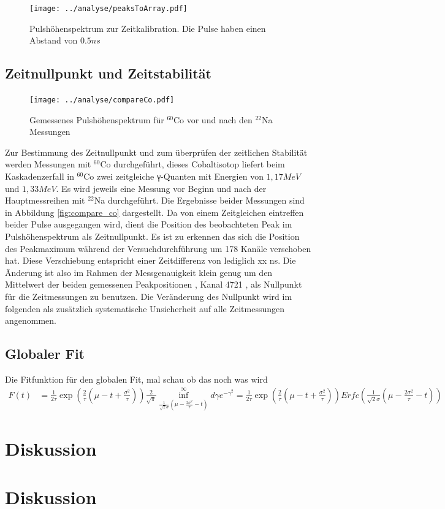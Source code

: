 \documentclass[a4paper,12pt]{article}
\begin{document}
		\begin{figure}
		\texttt{[image: ../analyse/peaksToArray.pdf]}
		\caption{Pulshöhenspektrum zur Zeitkalibration. Die Pulse haben einen Abstand von $0.5\si{ns}$}
		\label{fig:timepuls}
		\end{figure}
\subsection{Zeitnullpunkt und Zeitstabilität}
		\begin{figure}
		\texttt{[image: ../analyse/compareCo.pdf]}
		\caption{Gemessenes Pulshöhenspektrum für $^{60}$Co vor und nach den $^{22}$Na Messungen}
		\label{fig:timepuls}
		\end{figure}
	Zur Bestimmung des Zeitnullpunkt und zum überprüfen der zeitlichen Stabilität werden Messungen mit $^{60}$Co durchgeführt, dieses Cobaltisotop liefert 
	beim Kaskadenzerfall in $^{60}$Co zwei zeitgleiche γ-Quanten mit Energien von $1,17\si{MeV}$ und $1,33\si{MeV}$. Es wird jeweils eine Messung vor Beginn
	und nach der Hauptmessreihen mit $^{22}$Na durchgeführt. Die Ergebnisse beider Messungen sind in Abbildung \ref{fig:compare_co} dargestellt.
	Da von einem Zeitgleichen eintreffen beider Pulse ausgegangen wird, dient die Position des beobachteten Peak im Pulshöhenspektrum als Zeitnullpunkt. Es
	ist zu erkennen das sich die Position des Peakmaximum während der Versuchdurchführung um 178 Kanäle verschoben hat. Diese Verschiebung entspricht einer
	Zeitdifferenz von lediglich xx ns. Die Änderung ist also im Rahmen der Messgenauigkeit klein genug um den Mittelwert der
	beiden gemessenen Peakpositionen , Kanal 4721 , als Nullpunkt für die Zeitmessungen zu benutzen. Die Veränderung des Nullpunkt wird im folgenden
	als zusätzlich systematische Unsicherheit auf alle Zeitmessungen angenommen.   
\subsection{Globaler Fit}
Die Fitfunktion für den globalen Fit, mal schau ob das noch was wird
\begin{align*}
	F(t) &= \frac{1}{2τ} \exp\left( \frac{2}{τ}\left( μ-t+\frac{σ^2}{τ} \right) \right) \frac{2}{\sqrt{π}}\inf_{\frac{1}{\sqrt{2}σ}\left( μ-\frac{2σ^2}{τ} -t \right)}^\infty dγ e^{-γ^2}
	= \frac{1}{2τ} \exp\left( \frac{2}{τ}\left( μ-t+\frac{σ^2}{τ} \right) \right) Erfc\left(\frac{1}{\sqrt{2}σ}\left( μ-\frac{2σ^2}{τ} -t \right)\right)
\end{align*}
\section{Diskussion}

 
\section{Diskussion} 
\end{document}
